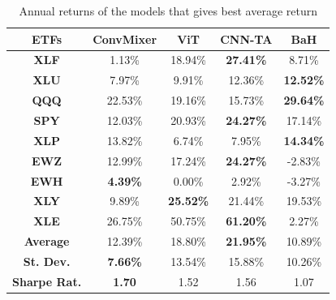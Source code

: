 \documentclass[]{article}
\begin{document}
\begin{table}[H]
\centering
 \begin{tabular}{c c c c c} 
 \hline
\textbf{ETFs} & \textbf{ConvMixer} & \textbf{ViT} & \textbf{CNN-TA} & \textbf{BaH} \\ [0.5ex] 
 \hline\hline
\textbf{XLF} & 1.13\% & 18.94\% & \textbf{27.41\%} & 8.71\% \\
 \hline
\textbf{XLU} & 7.97\% & 9.91\% & 12.36\% & \textbf{12.52\%} \\
 \hline
\textbf{QQQ} & 22.53\% & 19.16\% & 15.73\% & \textbf{29.64\%} \\
 \hline
\textbf{SPY} & 12.03\% & 20.93\% & \textbf{24.27\%} & 17.14\% \\
 \hline
\textbf{XLP} & 13.82\% & 6.74\% & 7.95\% & \textbf{14.34\%} \\
 \hline
\textbf{EWZ} & 12.99\% & 17.24\% & \textbf{24.27\%} & -2.83\% \\
 \hline
\textbf{EWH} & \textbf{4.39\%} & 0.00\% & 2.92\% & -3.27\% \\
 \hline
\textbf{XLY} & 9.89\% & \textbf{25.52\%} & 21.44\% & 19.53\% \\
 \hline
\textbf{XLE} & 26.75\% & 50.75\% & \textbf{61.20\%} & 2.27\% \\
 \hline
\textbf{Average} & 12.39\% & 18.80\% & \textbf{21.95\%} & 10.89\% \\
 \hline
\textbf{St. Dev.} & \textbf{7.66\%} & 13.54\% & 15.88\% & 10.26\% \\
 \hline
\textbf{Sharpe Rat.} & \textbf{1.70} & 1.52 & 1.56 & 1.07 \\
 \hline
 \end{tabular}
 \caption{Annual returns of the models that gives best average return}
\end{table}
\noindent
\end{document}

